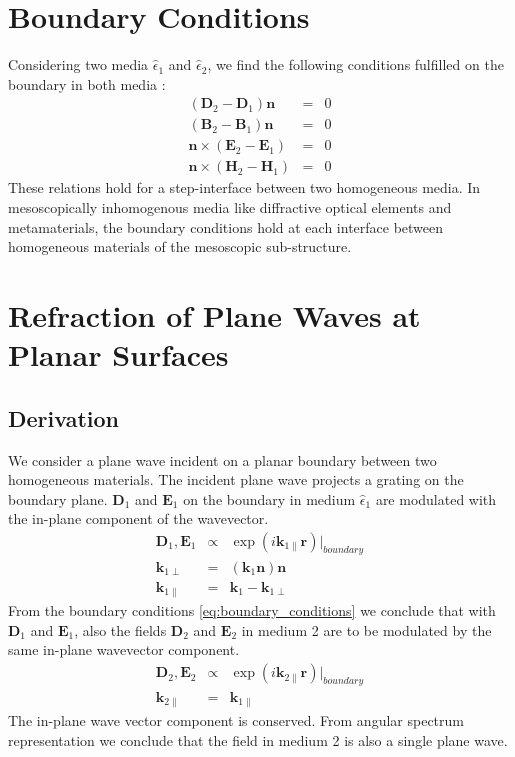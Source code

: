 \documentclass[12pt,a4paper,twoside,openright,BCOR10mm,headsepline,titlepage,abstracton,chapterprefix,final]{scrreprt}
\newcommand\Vector[1]{{\mathbf{#1}}}
\newcommand\Location{\Vector{r}}
\newcommand\wavenumber{k}
\newcommand\Wavevector{\Vector{\wavenumber}}
\newcommand\Tensor[1]{\hat{#1}}
\newcommand\scalarEfield{E}
\newcommand\scalarBfield{B}
\newcommand\scalarHfield{H}
\newcommand\scalarDfield{D}
\newcommand\Efield{\Vector{\scalarEfield}}
\newcommand\Bfield{\Vector{\scalarBfield}}
\newcommand\Hfield{\Vector{\scalarHfield}}
\newcommand\Dfield{\Vector{\scalarDfield}}
\newcommand\permittivity{\Tensor{\epsilon}}
\begin{document}
\section{Boundary Conditions}
Considering two media $\permittivity_1$ and $\permittivity_2$, we find the following conditions fulfilled on the boundary in both media \cite{Jackson}:
\begin{subequations}
\begin{eqnarray}
 ( \Dfield_2 - \Dfield_1 ) \Vector{n} &=& 0 \\
 ( \Bfield_2 - \Bfield_1 ) \Vector{n} &=& 0 \\
 \Vector{n} \times ( \Efield_2 - \Efield_1 ) &=& 0 \\
 \Vector{n} \times ( \Hfield_2 - \Hfield_1 ) &=& 0 
\end{eqnarray}
\label{eq:boundary_conditions} 
\end{subequations}
These relations hold for a step-interface between two homogeneous media. 
In mesoscopically inhomogenous media like  diffractive optical elements and metamaterials, 
the boundary conditions hold at each interface between homogeneous materials of the mesoscopic sub-structure.


\section{Refraction of Plane Waves at Planar Surfaces}

\subsection{Derivation}
We consider a plane wave incident on a planar boundary between two homogeneous materials.
The incident plane wave projects a grating on the boundary plane. $\Dfield_1$ and $\Efield_1$ on the boundary in medium $\permittivity_1$ are modulated with the in-plane component of the wavevector. 
\begin{eqnarray}
 \Dfield_1, \Efield_1 &\propto& \exp( i \Wavevector_{1\parallel} \Location)|_{boundary} \\
 \Wavevector_{1\perp} &=& ( \Wavevector_1 \Vector{n} ) \Vector{n} \\
 \Wavevector_{1\parallel} &=& \Wavevector_1 - \Wavevector_{1\perp}
\end{eqnarray}
From the boundary conditions \ref{eq:boundary_conditions} we conclude that with $\Dfield_1$ and $\Efield_1$, also the fields $\Dfield_2$ and $\Efield_2$ in medium 2 are to be modulated by the same in-plane wavevector component.
\begin{eqnarray}
  \Dfield_2, \Efield_2 &\propto& \exp( i \Wavevector_{2\parallel} \Location)|_{boundary} \\
  \Wavevector_{2\parallel} &=& \Wavevector_{1\parallel}
\end{eqnarray}
The in-plane wave vector component is conserved.
From angular spectrum representation we conclude that the field in medium 2 is also a single plane wave. 
\end{document}
